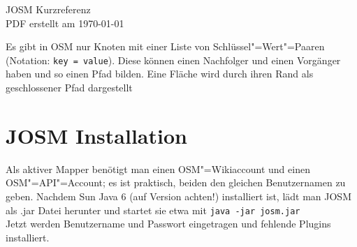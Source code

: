 \documentclass[a4paper,11pt,notumble]{leaflet}
\begin{document}
 

{\Huge JOSM Kurzreferenz}\\
{\small PDF erstellt am \today}

Es gibt in OSM nur Knoten mit einer Liste von Schlüssel"=Wert"=Paaren
(Notation: \texttt{key\,=\,value}).  Diese können einen Nachfolger und
einen Vorgänger haben und so einen Pfad bilden.  Eine Fläche wird
durch ihren Rand als geschlossener Pfad dargestellt

\section*{JOSM Installation} 
Als aktiver Mapper benötigt man einen OSM"=Wikiaccount und einen
OSM"=API"=Account; es ist praktisch, beiden den gleichen Benutzernamen
zu geben.  Nachdem Sun Java 6 (auf Version achten!) installiert ist,
lädt man JOSM als .jar Datei herunter und startet sie etwa mit
\texttt{java -jar josm.jar}\\
Jetzt werden Benutzername und Passwort eingetragen und fehlende
Plugins installiert.
\end{document}
